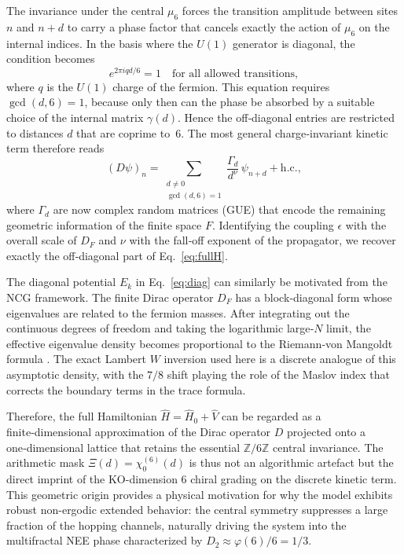 \documentclass[aps,prl,preprint,superscriptaddress,floatfix]{revtex4-2}
\begin{document}
The invariance under the central $\mu_6$ forces the transition amplitude between sites $n$ and $n+d$ to carry a phase factor that cancels exactly the action of $\mu_6$ on the internal indices. In the basis where the $U(1)$ generator is diagonal, the condition becomes
\begin{equation}
e^{2\pi i q d /6} = 1 \quad \text{for all allowed transitions},
\end{equation}
where $q$ is the $U(1)$ charge of the fermion. This equation requires $\gcd(d,6)=1$, because only then can the phase be absorbed by a suitable choice of the internal matrix $\gamma(d)$. Hence the off‑diagonal entries are restricted to distances $d$ that are coprime to~6. The most general charge‑invariant kinetic term therefore reads
\begin{equation}
(D\psi)_n = \sum_{\substack{d\neq 0 \\ \gcd(d,6)=1}} \frac{\Gamma_d}{d^{\nu}} \, \psi_{n+d} + \text{h.c.},
\end{equation}
where $\Gamma_d$ are now complex random matrices (GUE) that encode the remaining geometric information of the finite space $F$. Identifying the coupling $\epsilon$ with the overall scale of $D_F$ and $\nu$ with the fall‑off exponent of the propagator, we recover exactly the off‑diagonal part of Eq.~\eqref{eq:fullH}.

The diagonal potential $E_k$ in Eq.~\eqref{eq:diag} can similarly be motivated from the NCG framework. The finite Dirac operator $D_F$ has a block‑diagonal form whose eigenvalues are related to the fermion masses. After integrating out the continuous degrees of freedom and taking the logarithmic large‑$N$ limit, the effective eigenvalue density becomes proportional to the Riemann‑von Mangoldt formula \cite{Connes1999}. The exact Lambert $W$ inversion used here is a discrete analogue of this asymptotic density, with the $7/8$ shift playing the role of the Maslov index that corrects the boundary terms in the trace formula.

Therefore, the full Hamiltonian $\hat H = \hat H_0 + \hat V$ can be regarded as a finite‑dimensional approximation of the Dirac operator $D$ projected onto a one‑dimensional lattice that retains the essential $\mathbb{Z}/6\mathbb{Z}$ central invariance. The arithmetic mask $\Xi(d)=\chi_0^{(6)}(d)$ is thus not an algorithmic artefact but the direct imprint of the KO-dimension 6 chiral grading on the discrete kinetic term. This geometric origin provides a physical motivation for why the model exhibits robust non-ergodic extended behavior: the central symmetry suppresses a large fraction of the hopping channels, naturally driving the system into the multifractal NEE phase characterized by $D_2\approx\varphi(6)/6=1/3$.
\end{document}
